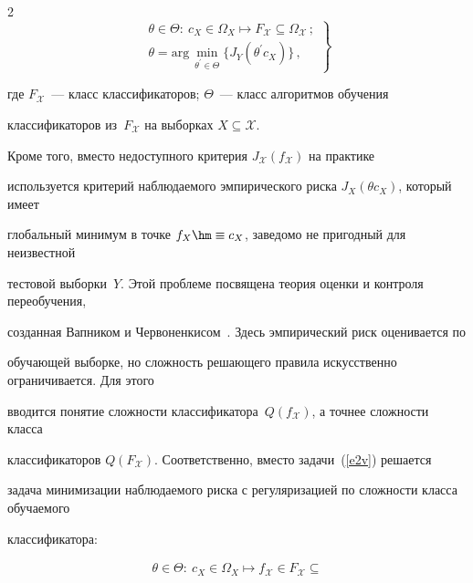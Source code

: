 \begin{multicols}{2}
\begin{equation}

\left.

\begin{array}{l}

\theta \in \Theta:\ c_X\in \Omega_X\mapsto F_{\mathcal{X}}\subseteq 

\Omega_{\mathcal{X}}\,;\\[9pt]

\theta = \mathrm{arg}\,\min\limits_{\theta^\prime \in \Theta} \{ J_Y(\theta^\prime c_X)\}\,,

\end{array}

\right\}

\label{e2v}

\end{equation}

где $F_{\mathcal{X}}$~--- класс классификаторов; $\Theta$~--- класс алгоритмов обучения 

классификаторов из~$F_{\mathcal{X}}$ на выборках $X\subseteq \mathcal{X}$. 



Кроме того, вместо недоступного критерия $J_{\mathcal{X}}(f_{\mathcal{X}})$ на практике 

используется критерий наблюдаемого эмпирического риска $J_X(\theta c_X)$, который имеет 

глобальный минимум в точке $f_X\hm\equiv c_X$, заведомо не пригодный для неизвестной 

тестовой выборки~$Y$. Этой проблеме посвящена теория оценки и контроля переобучения, 

созданная Вапником и Червоненкисом~\cite{2v}. Здесь эмпирический риск оценивается по 

обучающей выборке, но сложность решающего правила искусственно ограничивается. Для этого 

вводится понятие сложности классификатора~$Q(f_{\mathcal{X}})$, а точнее сложности класса 

классификаторов $Q(F_{\mathcal{X}})$. Соответственно, вместо задачи~(\ref{e2v}) решается 

задача минимизации наблюдаемого риска с регуляризацией по сложности класса обучаемого 

классификатора:

\begin{gather*}

\theta \in \Theta:\ c_X\in\Omega_X\mapsto f_{\mathcal{X}}\in F_{\mathcal{X}}\subseteq 


\end{gather*}
\end{multicols}
